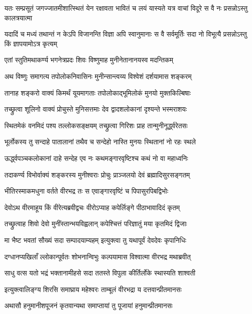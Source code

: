 \twolineshloka
{यतः सम्प्रसूतं जगज्जातमीशात्स्थितं येन रक्षावता भावितं च}
{लयं यास्यते यत्र वाचां विदूरे स वै नः प्रसन्नोऽस्तु कालत्रयात्मा}%

\twolineshloka
{यदादिं च मध्यं तथान्तं न केऽपि विजानन्ति विज्ञा अपि स्वानुमानाः}
{स वै सर्वमूर्तिः सदा नो विभूत्यै प्रसन्नोऽस्तु किं ज्ञापयामोऽत्र कृत्यम्}%

\twolineshloka
{एतां स्तुतिमथाकर्ण्य भगनेत्रप्रदः शिवः}
{विष्णुमाह मुनीनेतानानयस्व मदन्तिकम्}%

\twolineshloka
{अथ विष्णुः समागत्य तपोलोकनिवासिनः}
{मुनीन्सान्त्वय्य विश्वेशं दर्शयामास शङ्करम्}%

\twolineshloka
{तानाह शङ्करो वाक्यं किमर्थं यूयमागताः}
{तपोलोकाद्भूमिलोकं मुनयो मुक्तकिल्बिषाः}%

\twolineshloka
{तच्छ्रुत्वा शूलिनो वाक्यं प्रोचुस्ते मुनिसत्तमाः}
{देव द्वादशलोकानां दृश्यन्ते भस्मराशयः}%

\twolineshloka
{स्थितमेकं वनमिदं पश्य तल्लोकसङ्क्षयम्}
{तच्छ्रुत्वा गिरिशः प्राह तान्मुनीनूर्द्ध्वरेतसः}%

\twolineshloka
{भूर्लोकस्य तु सन्दाहे पातालानां तथैव च}
{सन्देहो नास्ति मुनयः स्थितानां नो रहः स्थले}%

\twolineshloka
{ऊर्द्ध्वपञ्चकलोकानां दाहे सन्देह एव नः}
{कथमङ्गारवृष्टिश्च कथं नो वा महाध्वनिः}%

\twolineshloka
{तदाकर्ण्य विभोर्वाक्यं शङ्करस्य मुनीश्वराः}
{प्रोचुः प्राञ्जलयो देवं ब्रह्मादिसुरसङ्गतम्}%

\twolineshloka
{भीतिरस्माकमधुना वर्तते वीरभद्र तः}
{स एवाङ्गारवृष्टिं च पिपासुरपिबद्विभोः}%

\twolineshloka
{देवोऽथ वीरमाहूय किं वीरेत्यब्रवीद्वचः}
{वीरोऽप्याह कपेर्लिङ्गे पीठाभावादिदं कृतम्}%

\twolineshloka
{तच्छ्रुत्वाह शिवो देवो मुनींस्तान्भयविह्वलान्}
{कपेश्चित्तं परिज्ञातुं मया कृतमिदं द्विजाः}%

\twolineshloka
{मा भैष्ट भवतां सौख्यं सदा सम्पादयाम्यहम्}
{इत्युक्त्वा तु यथापूर्वं देवदेवः कृपानिधिः}%

\twolineshloka
{दग्धानप्यखिलाँ ल्लोकान्पूर्वतः शोभनान्विभुः}
{कल्पयामास विश्वात्मा वीरभद्र मथाब्रवीत्}%

\twolineshloka
{साधु वत्स यतो भद्रं भक्तानामीहसे सदा}
{ततस्ते विपुला कीर्तिर्लोके स्थास्यति शाश्वती}%

\twolineshloka
{इत्युक्त्वालिङ्ग्य शिरसि समाघ्राय महेश्वरः}
{ताम्बूलं वीरभद्रा य दत्तवान्प्रीतमानसः}%

\twolineshloka
{अथासौ हनुमानीशपूजनं कृतवान्यथा}
{समाप्तायां तु पूजायां हनुमान्प्रीतमानसः}%

